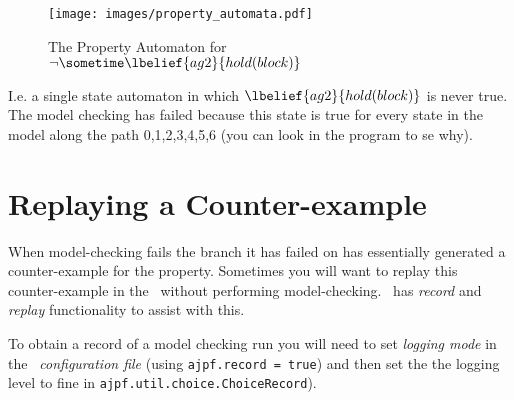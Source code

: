 \begin{figure}[htb]
\begin{center}
\texttt{[image: images/property\_automata.pdf]}
\end{center}
\caption{The Property Automaton for $\neg \sometime \lbelief{ag2}{hold(block)}$}
\label{fig:automaton}
\end{figure}

I.e. a single state automaton in which $\lbelief{ag2}{hold(block)}$ is never true.  The model checking has failed because this state is true for every state in the model along the path 0,1,2,3,4,5,6 (you can look in the program to se why).

\section{Replaying a Counter-example}
When model-checking fails the branch it has failed on has essentially generated a counter-example for the property.  Sometimes you will want to replay this counter-example in the \ail\ without performing model-checking.  \ajpf\ has \emph{record} and \emph{replay} functionality to assist with this.

To obtain a record of a model checking run you will need to set \emph{logging mode} in the \emph{\ail\ configuration file} (using \texttt{ajpf.record = true}) and then set the the logging level to fine in \texttt{ajpf.util.choice.ChoiceRecord}).

